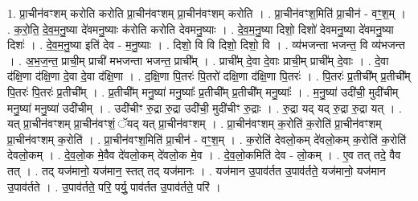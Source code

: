 \documentclass[17pt]{extarticle}
\begin{document}
1. प्रा॒चीन॑वꣳशम् करोति करोति प्रा॒चीन॑वꣳशम् प्रा॒चीन॑वꣳशम् करोति । . प्रा॒चीन॑वꣳश॒मिति॑ प्रा॒चीन॑ - वꣳ॒॒श॒म् । . क॒रो॒ति॒ दे॒व॒म॒नु॒ष्या दे॑वमनु॒ष्याः क॑रोति करोति देवमनु॒ष्याः । . दे॒व॒म॒नु॒ष्या दिशो॒ दिशो॑ देवमनु॒ष्या दे॑वमनु॒ष्या दिशः॑ । . दे॒व॒म॒नु॒ष्या इति॑ देव - म॒नु॒ष्याः । . दिशो॒ वि वि दिशो॒ दिशो॒ वि । . व्य॑भजन्ता भजन्त॒ वि व्य॑भजन्त । . अ॒भ॒ज॒न्त॒ प्राची॒म् प्राची॑ मभजन्ता भजन्त॒ प्राची᳚म् । . प्राची᳚म् दे॒वा दे॒वाः प्राची॒म् प्राची᳚म् दे॒वाः । . दे॒वा द॑क्षि॒णा द॑क्षि॒णा दे॒वा दे॒वा द॑क्षि॒णा । . द॒क्षि॒णा पि॒तरः॑ पि॒तरो॑ दक्षि॒णा द॑क्षि॒णा पि॒तरः॑ । . पि॒तरः॑ प्र॒तीची᳚म् प्र॒तीची᳚म् पि॒तरः॑ पि॒तरः॑ प्र॒तीची᳚म् । . प्र॒तीची᳚म् मनु॒ष्या॑ मनु॒ष्याः᳚ प्र॒तीची᳚म् प्र॒तीची᳚म् मनु॒ष्याः᳚ । . म॒नु॒ष्या॑ उदी॑ची॒ मुदी॑चीम् मनु॒ष्या॑ मनु॒ष्या॑ उदी॑चीम् । . उदी॑चीꣳ रु॒द्रा रु॒द्रा उदी॑ची॒ मुदी॑चीꣳ रु॒द्राः । . रु॒द्रा यद् यद् रु॒द्रा रु॒द्रा यत् । . यत् प्रा॒चीन॑वꣳशम् प्रा॒चीन॑वꣳशं॒ ॅयद् यत् प्रा॒चीन॑वꣳशम् । . प्रा॒चीन॑वꣳशम् क॒रोति॑ क॒रोति॑ प्रा॒चीन॑वꣳशम् प्रा॒चीन॑वꣳशम् क॒रोति॑ । . प्रा॒चीन॑वꣳश॒मिति॑ प्रा॒चीन॑ - वꣳ॒॒श॒म् । . क॒रोति॑ देवलो॒कम् दे॑वलो॒कम् क॒रोति॑ क॒रोति॑ देवलो॒कम् । . दे॒व॒लो॒क मे॒वैव दे॑वलो॒कम् दे॑वलो॒क मे॒व । . दे॒व॒लो॒कमिति॑ देव - लो॒कम् । . ए॒व तत् तदे॒ वैव तत् । . तद् यज॑मानो॒ यज॑मान॒ स्तत् तद् यज॑मानः । . यज॑मान उ॒पाव॑र्तत उ॒पाव॑र्तते॒ यज॑मानो॒ यज॑मान उ॒पाव॑र्तते । . उ॒पाव॑र्तते॒ परि॒ पर्यु॒ पाव॑र्तत उ॒पाव॑र्तते॒ परि॑ । \newline
\end{document}
